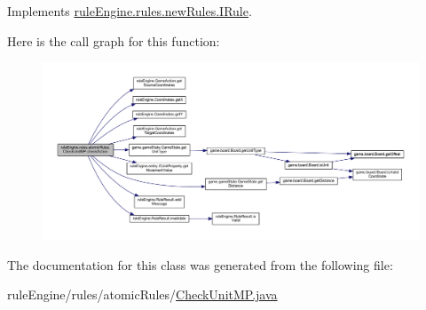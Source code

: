 Implements \mbox{\hyperlink{interfacerule_engine_1_1rules_1_1new_rules_1_1_i_rule_a72ce29a47d7a5fba75a09444a50a481e}{rule\+Engine.\+rules.\+new\+Rules.\+I\+Rule}}.

Here is the call graph for this function\+:
\nopagebreak
\begin{figure}[H]
\begin{center}
\leavevmode
\includegraphics[width=350pt]{classrule_engine_1_1rules_1_1atomic_rules_1_1_check_unit_m_p_ab5e04bb0355061dabd2ade65bf65d635_cgraph}
\end{center}
\end{figure}


The documentation for this class was generated from the following file\+:\begin{DoxyCompactItemize}
\item 
rule\+Engine/rules/atomic\+Rules/\mbox{\hyperlink{_check_unit_m_p_8java}{Check\+Unit\+M\+P.\+java}}\end{DoxyCompactItemize}
